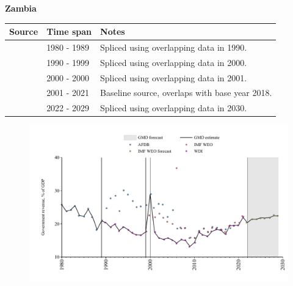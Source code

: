 \documentclass[12pt,a4paper,landscape]{article}
\begin{document}
\begin{adjustbox}{max totalsize={\paperwidth}{\paperheight},center}
\begin{minipage}[t][\textheight][t]{\textwidth}
\vspace*{0.5cm}
{}
\begin{center}
{\Large\bfseries Zambia}
\end{center}
\vspace{0.5cm}
\begin{table}[H]
\centering
\small
\begin{tabular}{|l|l|l|}
\hline
\textbf{Source} & \textbf{Time span} & \textbf{Notes} \\
\hline
\rowcolor{white}\cite{AFDB}& 1980 - 1989 &Spliced using overlapping data in 1990.\\
\rowcolor{lightgray}\cite{WDI}& 1990 - 1999 &Spliced using overlapping data in 2000.\\
\rowcolor{white}\cite{AFDB}& 2000 - 2000 &Spliced using overlapping data in 2001.\\
\rowcolor{lightgray}\cite{WDI}& 2001 - 2021 &Baseline source, overlaps with base year 2018.\\
\rowcolor{white}\cite{IMF_WEO_forecast}& 2022 - 2029 &Spliced using overlapping data in 2030.\\
\hline
\end{tabular}
\end{table}
\begin{figure}[H]
\centering
\includegraphics[width=\textwidth,height=0.6\textheight,keepaspectratio]{graphs/ZMB_govrev_GDP.pdf}
\end{figure}
\end{minipage}
\end{adjustbox}
\end{document}
